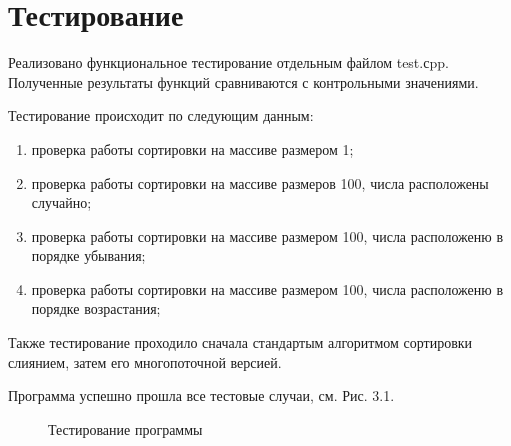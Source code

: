 \documentclass[12pt]{report}
\begin{document}
\newpage
\section{Тестирование}
Реализовано функциональное тестирование отдельным файлом test.сpp. Полученные результаты функций сравниваются с контрольными значениями. \vspace{\baselineskip}

Тестирование происходит по следующим данным:
\begin{enumerate}
	\item проверка работы сортировки на массиве размером 1;
	\item проверка работы сортировки на массиве размеров 100, числа расположены случайно;
	\item проверка работы сортировки на массиве размером 100, числа расположеню в порядке убывания;
	\item проверка работы сортировки на массиве размером 100, числа расположеню в порядке возрастания;
\end{enumerate}

Также тестирование проходило сначала стандартым алгоритмом сортировки слиянием, затем его многопоточной версией.

\vspace{\baselineskip}

Программа успешно прошла все тестовые случаи, см. Рис. 3.1. 

\begin{figure}[h]
	\caption{Тестирование программы}
	\label{figure:image}
\end{figure}
\end{document}
